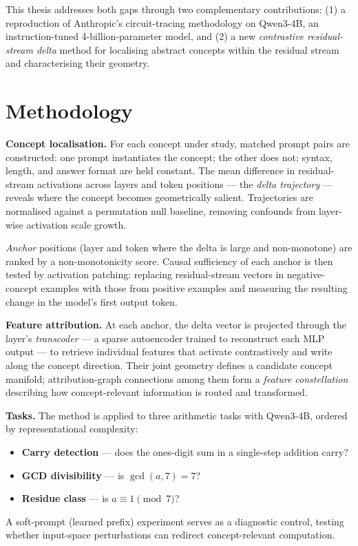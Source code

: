 \documentclass[11pt,a4paper]{article}
\begin{document}
This thesis addresses both gaps through two complementary contributions: (1) a reproduction of Anthropic's circuit-tracing methodology on Qwen3-4B, an instruction-tuned 4-billion-parameter model, and (2) a new \emph{contrastive residual-stream delta} method for localising abstract concepts within the residual stream and characterising their geometry.

\section{Methodology}

\textbf{Concept localisation.}\enspace
For each concept under study, matched prompt pairs are constructed: one prompt instantiates the concept; the other does not; syntax, length, and answer format are held constant. The mean difference in residual-stream activations across layers and token positions — the \emph{delta trajectory} — reveals where the concept becomes geometrically salient. Trajectories are normalised against a permutation null baseline, removing confounds from layer-wise activation scale growth.

\emph{Anchor} positions (layer and token where the delta is large and non-monotone) are ranked by a non-monotonicity score. Causal sufficiency of each anchor is then tested by activation patching: replacing residual-stream vectors in negative-concept examples with those from positive examples and measuring the resulting change in the model's first output token.

\textbf{Feature attribution.}\enspace
At each anchor, the delta vector is projected through the layer's \emph{transcoder} — a sparse autoencoder trained to reconstruct each MLP output — to retrieve individual features that activate contrastively and write along the concept direction. Their joint geometry defines a candidate concept manifold; attribution-graph connections among them form a \emph{feature constellation} describing how concept-relevant information is routed and transformed.

\textbf{Tasks.}\enspace
The method is applied to three arithmetic tasks with Qwen3-4B, ordered by representational complexity:
\begin{itemize}
  \item \textbf{Carry detection} — does the ones-digit sum in a single-step addition carry?
  \item \textbf{GCD divisibility} — is $\gcd(a,7)=7$?
  \item \textbf{Residue class} — is $a \equiv 1\pmod{7}$?
\end{itemize}
A soft-prompt (learned prefix) experiment serves as a diagnostic control, testing whether input-space perturbations can redirect concept-relevant computation.
\end{document}
